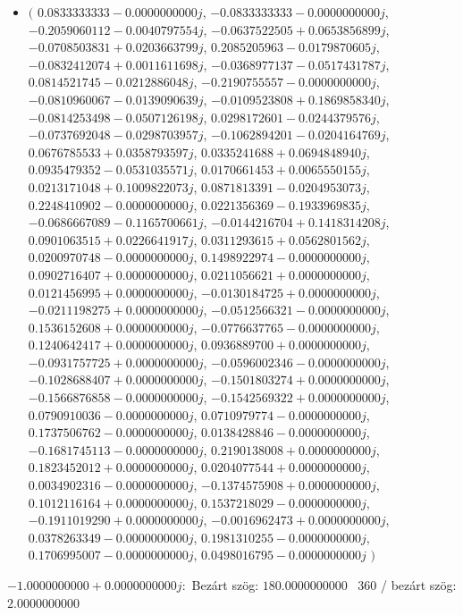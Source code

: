 \documentclass[14pt,a4paper]{article}
\begin{document}
\begin{itemize}
\item
$\big($
$0.0833333333-0.0000000000j$, $-0.0833333333-0.0000000000j$, $-0.2059060112-0.0040797554j$, $-0.0637522505+0.0653856899j$, $-0.0708503831+0.0203663799j$, $0.2085205963-0.0179870605j$, $-0.0832412074+0.0011611698j$, $-0.0368977137-0.0517431787j$, $0.0814521745-0.0212886048j$, $-0.2190755557-0.0000000000j$, $-0.0810960067-0.0139090639j$, $-0.0109523808+0.1869858340j$, $-0.0814253498-0.0507126198j$, $0.0298172601-0.0244379576j$, $-0.0737692048-0.0298703957j$, $-0.1062894201-0.0204164769j$, $0.0676785533+0.0358793597j$, $0.0335241688+0.0694848940j$, $0.0935479352-0.0531035571j$, $0.0170661453+0.0065550155j$, $0.0213171048+0.1009822073j$, $0.0871813391-0.0204953073j$, $0.2248410902-0.0000000000j$, $0.0221356369-0.1933969835j$, $-0.0686667089-0.1165700661j$, $-0.0144216704+0.1418314208j$, $0.0901063515+0.0226641917j$, $0.0311293615+0.0562801562j$, $0.0200970748-0.0000000000j$, $0.1498922974-0.0000000000j$, $0.0902716407+0.0000000000j$, $0.0211056621+0.0000000000j$, $0.0121456995+0.0000000000j$, $-0.0130184725+0.0000000000j$, $-0.0211198275+0.0000000000j$, $-0.0512566321-0.0000000000j$, $0.1536152608+0.0000000000j$, $-0.0776637765-0.0000000000j$, $0.1240642417+0.0000000000j$, $0.0936889700+0.0000000000j$, $-0.0931757725+0.0000000000j$, $-0.0596002346-0.0000000000j$, $-0.1028688407+0.0000000000j$, $-0.1501803274+0.0000000000j$, $-0.1566876858-0.0000000000j$, $-0.1542569322+0.0000000000j$, $0.0790910036-0.0000000000j$, $0.0710979774-0.0000000000j$, $0.1737506762-0.0000000000j$, $0.0138428846-0.0000000000j$, $-0.1681745113-0.0000000000j$, $0.2190138008+0.0000000000j$, $0.1823452012+0.0000000000j$, $0.0204077544+0.0000000000j$, $0.0034902316-0.0000000000j$, $-0.1374575908+0.0000000000j$, $0.1012116164+0.0000000000j$, $0.1537218029-0.0000000000j$, $-0.1911019290+0.0000000000j$, $-0.0016962473+0.0000000000j$, $0.0378263349-0.0000000000j$, $0.1981310255-0.0000000000j$, $0.1706995007-0.0000000000j$, $0.0498016795-0.0000000000j$
$\big)$
\end{itemize}
$-1.0000000000+0.0000000000j$:\
Bezárt szög: $180.0000000000$ \
360 / bezárt szög: $2.0000000000$\
\end{document}
